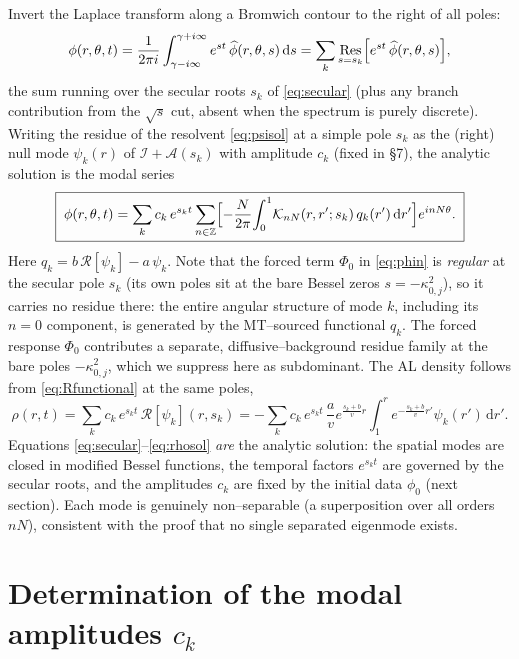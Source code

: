 \documentclass{article}
\newcommand{\rd}{\mathrm{d}}
\newcommand{\Res}{\operatorname*{Res}}
\begin{document}
Invert the Laplace transform along a Bromwich contour to the right of all poles:
\begin{equation}
\phi(r,\theta,t)=\frac{1}{2\pi i}\int_{\gamma-i\infty}^{\gamma+i\infty}
e^{st}\,\widehat\phi(r,\theta,s)\,\rd s
=\sum_{k}\Res_{s=s_k}\Bigl[e^{st}\,\widehat\phi(r,\theta,s)\Bigr],
\label{eq:bromwich}
\end{equation}
the sum running over the secular roots $s_k$ of \eqref{eq:secular} (plus any
branch contribution from the $\sqrt s$ cut, absent when the spectrum is purely
discrete). Writing the residue of the resolvent \eqref{eq:psisol} at a simple
pole $s_k$ as the (right) null mode $\psi_k(r)$ of $\mathcal I+\mathcal A(s_k)$
with amplitude $c_k$ (fixed in \S7), the analytic solution is the modal series
\begin{equation}
\boxed{\;
\phi(r,\theta,t)=\sum_k c_k\,e^{s_k t}
\sum_{n\in\mathbb Z}\Bigl[
-\frac{N}{2\pi}\!\int_0^1\!\mathcal K_{nN}(r,r';s_k)\,q_k(r')\,\rd r'\Bigr]e^{inN\theta}.
\;}
\label{eq:phisol}
\end{equation}
Here $q_k=b\,\mathcal R[\psi_k]-a\,\psi_k$. Note that the forced term $\Phi_0$ in
\eqref{eq:phin} is \emph{regular} at the secular pole $s_k$ (its own poles sit at
the bare Bessel zeros $s=-\kappa_{0,j}^2$), so it carries no residue there: the
entire angular structure of mode $k$, including its $n=0$ component, is generated
by the MT--sourced functional $q_k$. The forced response $\Phi_0$ contributes a
separate, diffusive--background residue family at the bare poles
$-\kappa_{0,j}^2$, which we suppress here as subdominant. The AL density follows from
\eqref{eq:Rfunctional} at the same poles,
\begin{equation}
\rho(r,t)=\sum_k c_k\,e^{s_k t}\,\mathcal R[\psi_k](r,s_k)
=-\sum_k c_k\,e^{s_k t}\,\frac{a}{v}e^{\frac{s_k+b}{v}r}
\int_1^r e^{-\frac{s_k+b}{v}r'}\psi_k(r')\,\rd r' .
\label{eq:rhosol}
\end{equation}
Equations \eqref{eq:secular}--\eqref{eq:rhosol} \emph{are} the analytic solution:
the spatial modes are closed in modified Bessel functions, the temporal factors
$e^{s_kt}$ are governed by the secular roots, and the amplitudes $c_k$ are fixed
by the initial data $\phi_0$ (next section). Each mode is genuinely
non--separable (a superposition over all orders $nN$), consistent with the proof
that no single separated eigenmode exists.

\section{Determination of the modal amplitudes $c_k$}
\end{document}
